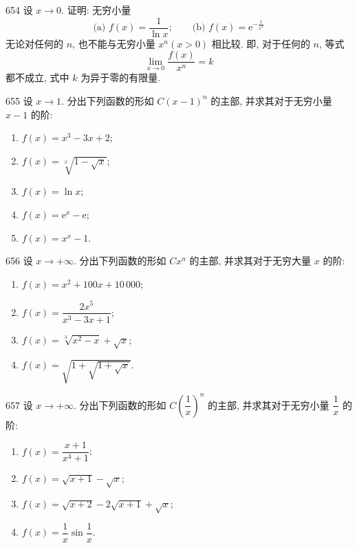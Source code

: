 \begin{prob}[M]{654}
设 $x \to 0$. 证明: 无穷小量
\[
  \text{(a) } f(x) = \frac{1}{\ln x}; \qquad \text{(b) } f(x) = \mathrm{e}^{-\frac{1}{x^2}}
\]
无论对任何的 $n$, 也不能与无穷小量 $x^n (x > 0)$ 相比较. 即, 对于任何的 $n$, 等式
\[
  \lim_{x \to 0} \frac{f(x)}{x^n} = k
\]
都不成立, 式中 $k$ 为异于零的有限量.
\end{prob}

\begin{prob}[L]{655}
设 $x \to 1$. 分出下列函数的形如 $C(x - 1)^n$ 的主部, 并求其对于无穷小量 $x - 1$ 的阶:
\begin{enumerate}[label=(\alph*), itemsep=2pt, topsep=3pt]
  \item $f(x) = x^3 - 3x + 2$;
  \item $f(x) = \sqrt[3]{1 - \sqrt{x}}$;
  \item $f(x) = \ln x$;
  \item $f(x) = \mathrm{e}^x - \mathrm{e}$;
  \item $f(x) = x^x - 1$.
\end{enumerate}
\end{prob}

\begin{prob}[L]{656}
设 $x \to +\infty$. 分出下列函数的形如 $Cx^n$ 的主部, 并求其对于无穷大量 $x$ 的阶:
\begin{enumerate}[label=(\alph*), itemsep=2pt, topsep=3pt]
  \item $f(x) = x^2 + 100x + 10\,000$;
  \item $f(x) = \dfrac{2x^5}{x^3 - 3x + 1}$;
  \item $f(x) = \sqrt[3]{x^2 - x} + \sqrt{x}$;
  \item $f(x) = \sqrt{1 + \sqrt{1 + \sqrt{x}}}$.
\end{enumerate}
\end{prob}

\begin{prob}[L]{657}
设 $x \to +\infty$. 分出下列函数的形如 $C\left(\dfrac{1}{x}\right)^n$ 的主部, 并求其对于无穷小量 $\dfrac{1}{x}$ 的阶:
\begin{enumerate}[label=(\alph*), itemsep=2pt, topsep=3pt]
  \item $f(x) = \dfrac{x + 1}{x^4 + 1}$;
  \item $f(x) = \sqrt{x + 1} - \sqrt{x}$;
  \item $f(x) = \sqrt{x + 2} - 2\sqrt{x + 1} + \sqrt{x}$;
  \item $f(x) = \dfrac{1}{x}\sin\dfrac{1}{x}$.
\end{enumerate}
\end{prob}

